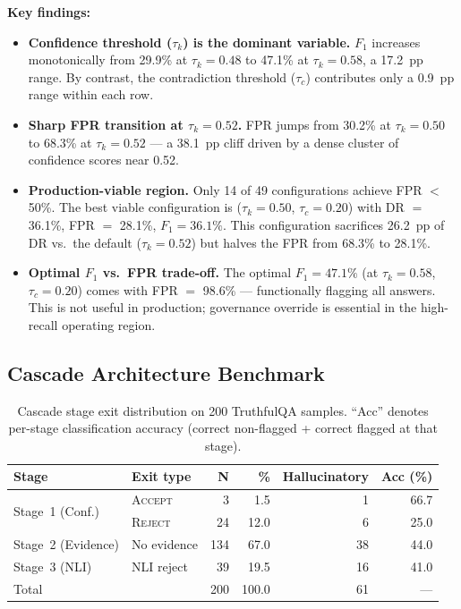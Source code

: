 \documentclass[11pt,a4paper]{article}
\newcommand{\fone}{F_1}
\newcommand{\tauK}{\tau_k}
\newcommand{\tauC}{\tau_c}
\begin{document}
\textbf{Key findings:}

\begin{itemize}
\item \textbf{Confidence threshold ($\tauK$) is the dominant variable.} $\fone$
      increases monotonically from 29.9\% at $\tauK = 0.48$ to 47.1\% at
      $\tauK = 0.58$, a 17.2~pp range. By contrast, the contradiction threshold
      ($\tauC$) contributes only a 0.9~pp range within each row.

\item \textbf{Sharp FPR transition at $\tauK = 0.52$.} FPR jumps from 30.2\%
      at $\tauK = 0.50$ to 68.3\% at $\tauK = 0.52$ --- a 38.1~pp cliff driven
      by a dense cluster of confidence scores near 0.52.

\item \textbf{Production-viable region.} Only 14 of 49 configurations achieve
      FPR $<$ 50\%. The best viable configuration is ($\tauK = 0.50$,
      $\tauC = 0.20$) with DR $=$ 36.1\%, FPR $=$ 28.1\%, $\fone = 36.1\%$.
      This configuration sacrifices 26.2~pp of DR vs.\ the default ($\tauK = 0.52$)
      but halves the FPR from 68.3\% to 28.1\%.

\item \textbf{Optimal $\fone$ vs.\ FPR trade-off.} The optimal $\fone = 47.1\%$
      (at $\tauK = 0.58$, $\tauC = 0.20$) comes with FPR $=$ 98.6\% ---
      functionally flagging all answers. This is not useful in production;
      governance override is essential in the high-recall operating region.
\end{itemize}

\subsection{Cascade Architecture Benchmark}
\label{sec:cascade}

\begin{table}[htb]
\centering
\caption{Cascade stage exit distribution on 200 TruthfulQA samples. ``Acc''
denotes per-stage classification accuracy (correct non-flagged + correct
flagged at that stage).}
\label{tab:cascade}
\begin{tabular}{llrrrr}
\toprule
\textbf{Stage} & \textbf{Exit type} & \textbf{N} & \textbf{\%} &
\textbf{Hallucinatory} & \textbf{Acc (\%)} \\
\midrule
\multirow{2}{*}{Stage~1 (Conf.)} & \textsc{Accept} &  3 &  1.5 & 1 & 66.7 \\
                                   & \textsc{Reject} & 24 & 12.0 & 6 & 25.0 \\
Stage~2 (Evidence)                 & No evidence     & 134 & 67.0 & 38 & 44.0 \\
Stage~3 (NLI)                      & NLI reject      & 39 & 19.5 & 16 & 41.0 \\
\midrule
Total                              &                 & 200 & 100.0 & 61 & --- \\
\bottomrule
\end{tabular}
\end{table}
\end{document}
